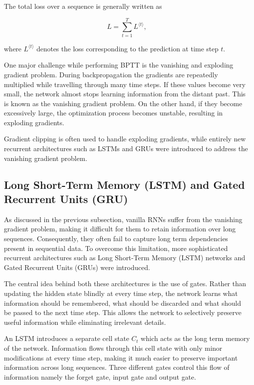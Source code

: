 \documentclass[12pt]{article}
\begin{document}
The total loss over a sequence is generally written as

\[
L
=
\sum_{t=1}^{T}
L^{\langle t\rangle},
\]

where $L^{\langle t\rangle}$ denotes the loss corresponding to the prediction at time step $t$.

One major challenge while performing BPTT is the vanishing and exploding gradient problem. During backpropagation the gradients are repeatedly multiplied while travelling through many time steps. If these values become very small, the network almost stops learning information from the distant past. This is known as the vanishing gradient problem. On the other hand, if they become excessively large, the optimization process becomes unstable, resulting in exploding gradients.

Gradient clipping is often used to handle exploding gradients, while entirely new recurrent architectures such as LSTMs and GRUs were introduced to address the vanishing gradient problem.

\subsection{Long Short-Term Memory (LSTM) and Gated Recurrent Units (GRU)}

As discussed in the previous subsection, vanilla RNNs suffer from the vanishing gradient problem, making it difficult for them to retain information over long sequences. Consequently, they often fail to capture long term dependencies present in sequential data. To overcome this limitation, more sophisticated recurrent architectures such as Long Short-Term Memory (LSTM) networks and Gated Recurrent Units (GRUs) were introduced.

The central idea behind both these architectures is the use of gates. Rather than updating the hidden state blindly at every time step, the network learns what information should be remembered, what should be discarded and what should be passed to the next time step. This allows the network to selectively preserve useful information while eliminating irrelevant details.

An LSTM introduces a separate cell state $C_t$ which acts as the long term memory of the network. Information flows through this cell state with only minor modifications at every time step, making it much easier to preserve important information across long sequences. Three different gates control this flow of information namely the forget gate, input gate and output gate.
\end{document}
